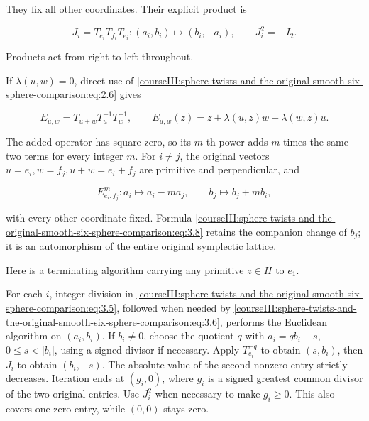 They fix all other coordinates. Their explicit product is

\begin{equation}
J_i=T_{e_i}T_{f_i}T_{e_i}:
           (a_i,b_i)\longmapsto(b_i,-a_i),\qquad J_i^2=-I_2.
 \label{courseIII:sphere-twists-and-the-original-smooth-six-sphere-comparison:eq:3.6}
\end{equation}

Products act from right to left throughout.

If \(\lambda(u,w)=0\), direct use of \eqref{courseIII:sphere-twists-and-the-original-smooth-six-sphere-comparison:eq:2.6} gives

\begin{equation}
E_{u,w}=T_{u+w}T_u^{-1}T_w^{-1},
 \qquad
 E_{u,w}(z)=z+\lambda(u,z)w+\lambda(w,z)u.
 \label{courseIII:sphere-twists-and-the-original-smooth-six-sphere-comparison:eq:3.7}
\end{equation}

The added operator has square zero, so its \(m\)-th power adds \(m\) times the same two terms for every integer \(m\). For \(i\ne j\), the original vectors \(u=e_i,w=f_j,u+w=e_i+f_j\) are primitive and perpendicular, and

\begin{equation}
E_{e_i,f_j}^{m}:
      a_i\longmapsto a_i-ma_j,\qquad
      b_j\longmapsto b_j+mb_i ,
 \label{courseIII:sphere-twists-and-the-original-smooth-six-sphere-comparison:eq:3.8}
\end{equation}

with every other coordinate fixed. Formula \eqref{courseIII:sphere-twists-and-the-original-smooth-six-sphere-comparison:eq:3.8} retains the companion change of \(b_j\); it is an automorphism of the entire original symplectic lattice.

Here is a terminating algorithm carrying any primitive \(z\in H\) to \(e_1\).

For each \(i\), integer division in \eqref{courseIII:sphere-twists-and-the-original-smooth-six-sphere-comparison:eq:3.5}, followed when needed by \eqref{courseIII:sphere-twists-and-the-original-smooth-six-sphere-comparison:eq:3.6}, performs the Euclidean algorithm on \((a_i,b_i)\). If \(b_i\ne0\), choose the quotient \(q\) with \(a_i=qb_i+s\), \(0\le s<|b_i|\), using a signed divisor if necessary. Apply \(T_{e_i}^{-q}\) to obtain \((s,b_i)\), then \(J_i\) to obtain \((b_i,-s)\). The absolute value of the second nonzero entry strictly decreases. Iteration ends at \((g_i,0)\), where \(g_i\) is a signed greatest common divisor of the two original entries. Use \(J_i^2\) when necessary to make \(g_i\ge0\). This also covers one zero entry, while \((0,0)\) stays zero.

